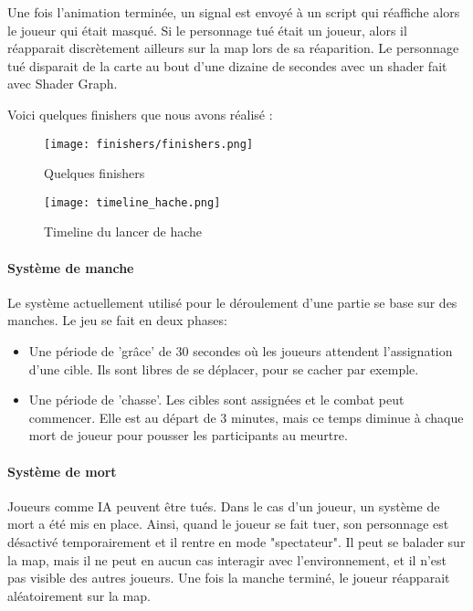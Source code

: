 			Une fois l'animation terminée, un signal est envoyé à un script qui réaffiche alors le joueur qui était masqué.
			Si le personnage tué était un joueur, alors il réapparait discrètement ailleurs sur la map lors de sa réaparition.
			Le personnage tué disparait de la carte au bout d'une dizaine de secondes avec un shader fait avec Shader Graph.

			Voici quelques finishers que nous avons réalisé :

			\begin{figure}[hbt!]
				\centering
				\texttt{[image: finishers/finishers.png]}
				\caption{Quelques finishers}
			\end{figure}

			\FloatBarrier
			\begin{figure}[hbt!]
				\centering
				\texttt{[image: timeline\_hache.png]}
				\caption{Timeline du lancer de hache}
			\end{figure}
			\FloatBarrier


		\paragraph{Système de manche}

			Le système actuellement utilisé pour le déroulement d'une partie se base sur des manches. Le jeu se fait en deux phases:
			\begin{itemize}
				\item Une période de 'grâce' de 30 secondes où les joueurs attendent l'assignation d'une cible. Ils sont libres de se déplacer, pour se cacher par exemple.
				\item Une période de 'chasse'. Les cibles sont assignées et le combat peut commencer. Elle est au départ de 3 minutes, mais ce temps
				diminue à chaque mort de joueur pour pousser les participants au meurtre.
			\end{itemize}
		

		\paragraph{Système de mort}

			Joueurs comme IA peuvent être tués. Dans le cas d'un joueur, un système de mort a été mis en place. Ainsi,
			quand le joueur se fait tuer, son personnage est désactivé temporairement et il rentre
			en mode "spectateur". Il peut se balader sur la map, mais il ne peut en aucun cas interagir avec l'environnement,
			et il n'est pas visible des autres joueurs. Une fois la manche terminé, le joueur réapparait aléatoirement sur la map.


